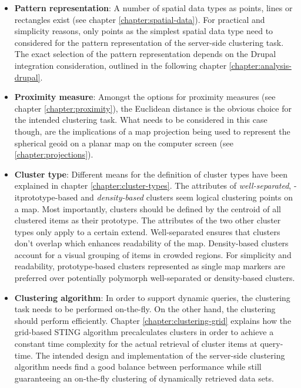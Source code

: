 \begin{itemize}

\item \textbf{Pattern representation}: A number of spatial data types as points, lines or rectangles exist (see chapter \ref{chapter:spatial-data}). For practical and simplicity reasons, only points as the simplest spatial data type need to considered for the pattern representation of the server-side clustering task. The exact selection of the pattern representation depends on the Drupal integration consideration, outlined in the following chapter \ref{chapter:analysis-drupal}.

\item \textbf{Proximity measure}: Amongst the options for proximity measures (see chapter \ref{chapter:proximity}), the Euclidean distance is the obvious choice for the intended clustering task. What needs to be considered in this case though, are the implications of a map projection being used to represent the spherical geoid on a planar map on the computer screen (see \ref{chapter:projections}).

\item \textbf{Cluster type}: Different means for the definition of cluster types have been explained in chapter \ref{chapter:cluster-types}. The attributes of \textit{well-separated}, \text-it{prototype-based} and \textit{density-based} clusters seem logical clustering points on a map. Most importantly, clusters should be defined by the centroid of all clustered items as their prototype. The attributes of the two other cluster types only apply to a certain extend. Well-separated ensures that clusters don't overlap which enhances readability of the map. Density-based clusters account for a visual grouping of items in crowded regions. For simplicity and readability, prototype-based clusters represented as single map markers are preferred over potentially polymorph well-separated or density-based clusters.

\item \textbf{Clustering algorithm}: In order to support dynamic queries, the clustering task needs to be performed on-the-fly. On the other hand, the clustering should perform efficiently. Chapter \ref{chapter:clustering-grid} explains how the grid-based STING algorithm precalculates clusters in order to achieve a constant time complexity for the actual retrieval of cluster items at query-time. The intended design and implementation of the server-side clustering algorithm needs find a good balance between performance while still guaranteeing an on-the-fly clustering of dynamically retrieved data sets.

\end{itemize}

